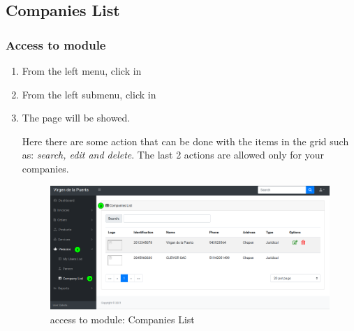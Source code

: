 \documentclass[a4paper,11pt]{refart}
\begin{document}
\subsection{Companies List}\label{section:company_list}
\subsubsection{Access to module}
\begin{enumerate}
	\item From the left menu, click in  
	\item From the left submenu, click in  
	\item The page will be showed.
	\medskip
	\begin{leftbar}
		Here there are some action that can be done with the items in the grid such as: \emph{search, edit and delete}. The last 2 actions are allowed only for your companies.
	\end{leftbar}
	\begin{figure}[H]\centering
		\includegraphics[width=\textwidth]{images/company_list-access.png}
		\caption{access to module: Companies List}
		\label{fig:company_list-access}
	\end{figure}
\end{enumerate}
\end{document}

